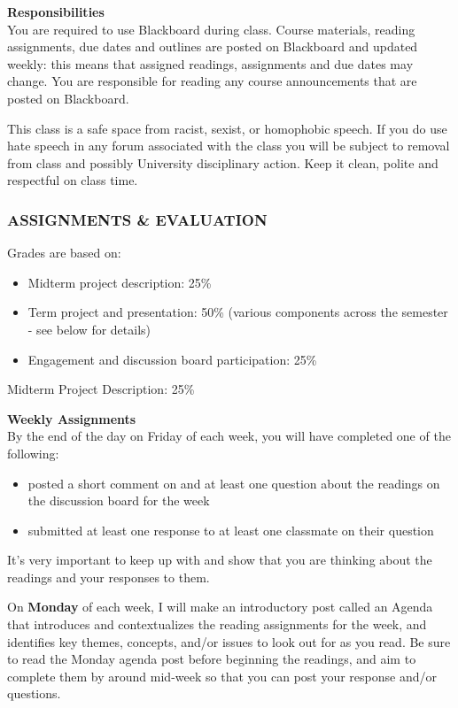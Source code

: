 \documentclass[]{tufte-handout}
\providecommand{\tightlist}{%
  \setlength{\itemsep}{0pt}\setlength{\parskip}{0pt}}
\begin{document}
\textbf{Responsibilities}\\
You are required to use Blackboard during class. Course materials,
reading assignments, due dates and outlines are posted on Blackboard and
updated weekly: this means that assigned readings, assignments and due
dates may change. You are responsible for reading any course
announcements that are posted on Blackboard.

This class is a safe space from racist, sexist, or homophobic speech. If
you do use hate speech in any forum associated with the class you will
be subject to removal from class and possibly University disciplinary
action. Keep it clean, polite and respectful on class time.

\hypertarget{assignments-evaluation}{%
\subsubsection{ASSIGNMENTS \& EVALUATION}\label{assignments-evaluation}}

Grades are based on:

\begin{itemize}
\tightlist
\item
  Midterm project description: 25\%
\item
  Term project and presentation: 50\% (various components across the
  semester - see below for details)
\item
  Engagement and discussion board participation: 25\%
\end{itemize}

Midterm Project Description: 25\%

\textbf{Weekly Assignments}\\
By the end of the day on Friday of each week, you will have completed
one of the following:

\begin{itemize}
\tightlist
\item
  posted a short comment on and at least one question about the readings
  on the discussion board for the week
\item
  submitted at least one response to at least one classmate on their
  question
\end{itemize}

It's very important to keep up with and show that you are thinking about
the readings and your responses to them.

On \textbf{Monday} of each week, I will make an introductory post called
an Agenda that introduces and contextualizes the reading assignments for
the week, and identifies key themes, concepts, and/or issues to look out
for as you read. Be sure to read the Monday agenda post before beginning
the readings, and aim to complete them by around mid-week so that you
can post your response and/or questions.
\end{document}
